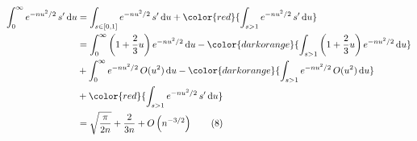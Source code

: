 \begin{align}
\int_0^\infty e^{-nu^2/2}\,s'\,\mathrm{d}u
&=\int_{s\in[0,1]} e^{-nu^2/2}\,s'\,\mathrm{d}u+\color{red}{\int_{s>1} e^{-nu^2/2}\,s'\,\mathrm{d}u}\\
&=\int_0^\infty\left(1+\frac23u\right)e^{-nu^2/2}\,\mathrm{d}u-\color{darkorange}{\int_{s>1}\left(1+\frac23u\right)e^{-nu^2/2}\,\mathrm{d}u}\\
&+\int_0^\infty e^{-nu^2/2}\,O(u^2)\,\mathrm{d}u-\color{darkorange}{\int_{s>1} e^{-nu^2/2}\,O(u^2)\,\mathrm{d}u}\\
&+\color{red}{\int_{s>1} e^{-nu^2/2}\,s'\,\mathrm{d}u}\\
&=\sqrt{\frac{\pi}{2n}}+\frac2{3n}+O\left(n^{-3/2}\right)\tag{8}
\end{align}